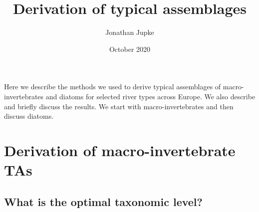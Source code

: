 \documentclass{article}
\title{Derivation of typical assemblages}
\author{Jonathan Jupke}
\date{October 2020}
\begin{document}
\maketitle


Here we describe the methods we used to derive typical assemblages of macro-invertebrates and diatoms for selected river types across Europe. We also describe and briefly discuss the results.
We start with macro-invertebrates and then discuss diatoms. \\

\section{Derivation of macro-invertebrate TAs}
	\subsection{What is the optimal taxonomic level?}
	
\end{document}
